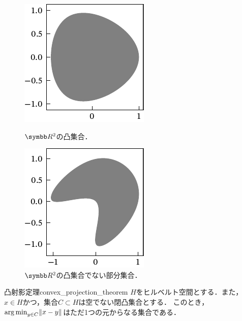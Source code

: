 \documentclass[../../main]{subfiles}
\begin{document}
\begin{figure}[htbp]
  \begin{minipage}{0.5\linewidth}
    \centering
    \includegraphics{figures/convex.pdf}
    \caption{\(\numset{R}^2\)の凸集合．}
  \end{minipage}%
  \begin{minipage}{0.5\linewidth}
    \centering
    \includegraphics{figures/non_convex.pdf}
    \caption{\(\numset{R}^2\)の凸集合でない部分集合．}
  \end{minipage}
\end{figure}

\begin{theorem}{凸射影定理}{convex_projection_theorem}
  \(H\)をヒルベルト空間とする．また，\(x\in H\)かつ，集合\(C\subset H\)は空でない閉凸集合とする．
  このとき，\(\operatorname*{arg\,min}_{y\in C}\lVert x-y\rVert\)はただ1つの元からなる集合である．
\end{theorem}
\end{document}
